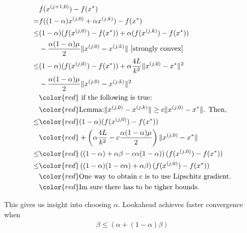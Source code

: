 \begin{align}
    & f(x^{(j + 1, 0)}) - f(x^*) \\
    =& f((1 - \alpha) x^{(j,  0)} + \alpha x^{(j, k)}) - f(x^*) \\
    \leq& (1 - \alpha) (f(x^{(j,  0)}) - f(x^*)) + \alpha (f(x^{(j,  k)}) - f(x^*)) \nonumber \\
    & - \frac{\alpha(1 - \alpha)\mu}{2}\|x^{(j,  0)} - x^{(j, k)} \| \text{ [strongly convex]} \\
    \leq& (1 - \alpha) (f(x^{(j,  0)}) - f(x^*)) + \alpha \frac{4L}{k^2}\|x^{(j,  0)} - x^* \|^2  \nonumber \\
    & - \frac{\alpha(1 - \alpha)\mu}{2}\|x^{(j,  0)} - x^{(j, k)} \|^2 \\
    &{\color{red} \text{  if the following is true: } \nonumber }\\
    &{\color{red} \text{Lemma:} \|x^{(j,  0)} - x^{(j, k)} \| \ge c\|x^{(j,  0)} - x^* \| \text{. Then,}} \nonumber \\
    \leq & {\color{red} (1 - \alpha) (f(x^{(j,  0)}) - f(x^*)) } \nonumber \\
    & {\color{red} + \left(\alpha\frac{4L}{k^2} - c\frac{\alpha(1 - \alpha)\mu}{2} \right) \|x^{(j,  0)} - x^* \|} \\
    \leq & {\color{red} \left((1 - \alpha) + \alpha \beta - c\alpha(1 - \alpha) \right) (f(x^{(j,  0)}) - f(x^*)) } \\
    \leq & {\color{red} \left((1 - \alpha)(1 - c\alpha) + \alpha \beta \right) (f(x^{(j,  0)}) - f(x^*)) } \\
    &{\color{red} \text{One way to obtain c is to use Lipschitz gradient.}} \nonumber \\
    &{\color{red} \text{Im sure there has to be tigher bounds. } } \nonumber
\end{align}

This gives us insight into choosing $\alpha$. Lookahead achieves faster convergence when 
\begin{align}
  \beta \leq (\alpha + (1 - \alpha) \beta) 
\end{align}